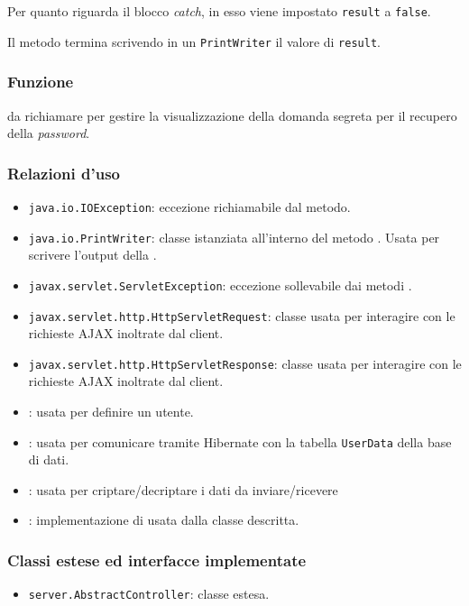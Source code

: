 \begin{description}
	Per quanto riguarda il blocco \textit{catch}, in esso viene impostato \texttt{result} a \texttt{false}.
	
	Il metodo termina scrivendo in un \texttt{PrintWriter} il valore di \texttt{result}.
\end{description}


\subsubsection*{Funzione}
 da richiamare per gestire la visualizzazione della domanda segreta per il recupero della \textit{password}.

\subsubsection*{Relazioni d'uso}
\begin{itemize}
	\item \texttt{java.io.IOException}: eccezione richiamabile dal metodo.
	\item \texttt{java.io.PrintWriter}: classe istanziata all'interno del metodo . Usata per scrivere l'output della .
	\item \texttt{javax.servlet.ServletException}: eccezione sollevabile dai metodi .
	\item \texttt{javax.servlet.http.HttpServletRequest}: classe usata per interagire con le richieste AJAX inoltrate dal client.
	\item \texttt{javax.servlet.http.HttpServletResponse}: classe usata per interagire con le richieste AJAX inoltrate dal client.
	\item {}: usata per definire un utente.
	\item {}: usata per comunicare tramite Hibernate con la tabella \texttt{UserData} della base di dati.
	\item {}: usata per criptare/decriptare i dati da inviare/ricevere
	\item {}: implementazione di  usata dalla classe descritta.
	
\end{itemize}

\subsubsection*{Classi estese ed interfacce implementate}
\begin{itemize}
	\item \texttt{server.AbstractController}: classe estesa.
\end{itemize}

